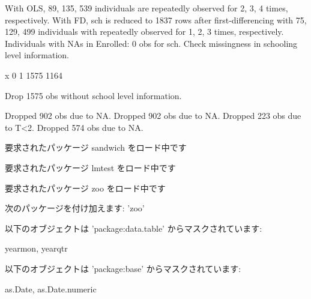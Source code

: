 With OLS,  89, 135, 539 individuals are repeatedly observed for 2, 3, 4 times, respectively. With FD, \textsf{sch} is reduced to 1837 rows after first-differencing with 75, 129, 499 individuals with repeatedly observed for 1, 2, 3 times, respectively.
Individuals with NAs in \textsf{Enrolled}: 0 obs for \textsf{sch}. 
Check missingness in schooling level information.
\begin{Schunk}
\begin{Soutput}
x
   0    1 
1575 1164 
\end{Soutput}
\end{Schunk}
Drop 1575 obs without school level information.




\begin{Schunk}
\begin{Soutput}
Dropped 902 obs due to NA.
Dropped 902 obs due to NA.
Dropped 223 obs due to T<2.
Dropped 574 obs due to NA.
\end{Soutput}
\end{Schunk}


\begin{Schunk}
\begin{Soutput}
要求されたパッケージ sandwich をロード中です
\end{Soutput}
\begin{Soutput}
要求されたパッケージ lmtest をロード中です
\end{Soutput}
\begin{Soutput}
要求されたパッケージ zoo をロード中です
\end{Soutput}
\begin{Soutput}

次のパッケージを付け加えます: 'zoo'
\end{Soutput}
\begin{Soutput}
以下のオブジェクトは 'package:data.table' からマスクされています:

    yearmon, yearqtr
\end{Soutput}
\begin{Soutput}
以下のオブジェクトは 'package:base' からマスクされています:

    as.Date, as.Date.numeric
\end{Soutput}
\end{Schunk}




